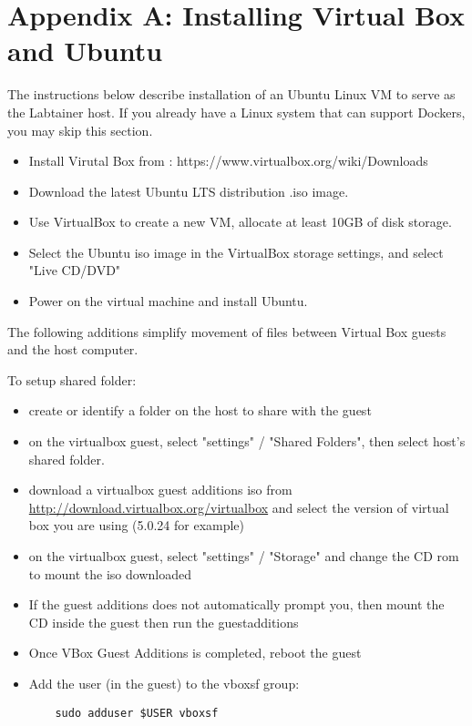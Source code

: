 \documentclass[12pt]{article}
\begin{document}
\section {Appendix A: Installing Virtual Box and Ubuntu}
\label{sec:appendixA}
The instructions below describe installation of an Ubuntu Linux VM 
to serve as the Labtainer host.  If you already have a Linux system
that can support Dockers, you may skip this section.
\begin{itemize}
\item Install Virutal Box from : https://www.virtualbox.org/wiki/Downloads
\item Download the latest Ubuntu LTS distribution .iso image.
\item Use VirtualBox to create a new VM, allocate at least 10GB of disk storage.
\item Select the Ubuntu iso image in the VirtualBox storage settings, and select "Live CD/DVD"
\item Power on the virtual machine and install Ubuntu.
\end{itemize}

The following additions simplify movement of files between Virtual Box guests
and the host computer.

To setup shared folder:
\begin{itemize}
\item create or identify a folder on the host to share with the guest
\item on the virtualbox guest, select "settings" / "Shared Folders",
then select host's shared folder.

\item download a virtualbox guest additions iso from 
\url{http://download.virtualbox.org/virtualbox} and select
the version of virtual box you are using (5.0.24 for example)

\item on the virtualbox guest, select "settings" / "Storage" and
change the CD rom to mount the iso downloaded

\item If the guest additions does not automatically prompt you, then mount the CD 
inside the guest then run the guestadditions

\item Once VBox Guest Additions is completed, reboot the guest

\item Add the user (in the guest) to the vboxsf group:
\begin{verbatim}
    sudo adduser $USER vboxsf
\end{verbatim}
\end{itemize}
\end{document}
